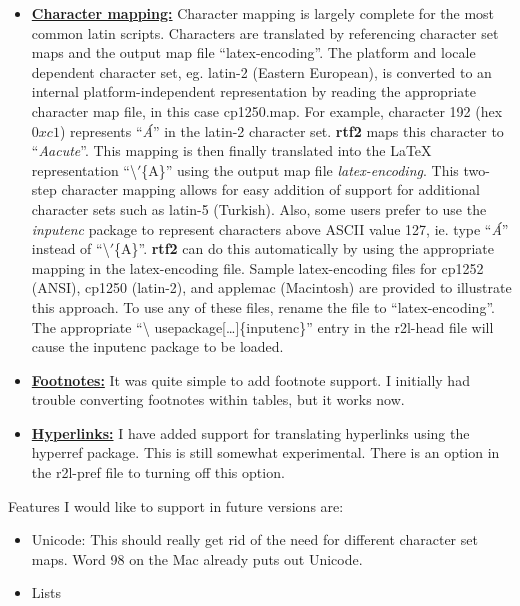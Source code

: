 \documentclass[11pt]{article}
\def\rtf2latex2e{{\bf rtf2\LaTeXe}}
\begin{document}
\begin{itemize}
\item 
{\bf {\underline {Character mapping:}}} Character mapping is largely
complete for the most common latin scripts.  Characters are translated
by referencing character set maps and the output map file
``latex-encoding''.  The platform and locale dependent character set, eg. 
latin-2 (Eastern European), is converted to an internal
platform-independent representation by reading the appropriate
character map file, in this case cp1250.map.  For example, character
192 (hex $0xc1$) represents ``\textit{\'{A}}'' in the latin-2
character set.  \rtf2latex2e maps this character to
``\textit{Aacute}''.  This mapping is then finally translated into the
{\LaTeX} representation ``\textbackslash$'$\{A\}'' using the output
map file \textit{latex-encoding}.  This two-step character mapping allows for
easy addition of support for additional character sets such as latin-5
(Turkish).  Also, some users prefer to use the \textit{inputenc}
package to represent characters above ASCII value 127, ie.  type
``\textit{\'{A}}'' instead of ``\textbackslash$'$\{A\}''. 
\rtf2latex2e can do this automatically by using the appropriate
mapping in the latex-encoding file.  Sample latex-encoding files for cp1252 (ANSI),
cp1250 (latin-2), and applemac (Macintosh) are provided to illustrate
this approach.  To use any of these files, rename the file to
``latex-encoding''.  The appropriate ``\textbackslash
usepackage[\ldots]\{inputenc\}'' entry in the r2l-head file will cause
the inputenc package to be loaded.

\item
{\bf {\underline {Footnotes:}}} It was quite simple to add footnote
support.  I initially had trouble converting footnotes within tables,
but it works now.

\item
{\bf {\underline {Hyperlinks:}}} I have added support for translating
hyperlinks using the hyperref package.  This is still somewhat
experimental.  There is an option in the r2l-pref file to turning off
this option.


\end{itemize}

\noindent
Features I would like to support in future versions are:
\begin{itemize}
\item
Unicode: This should really get rid of the need for different
character set maps.  Word 98 on the Mac already puts out Unicode.
\item
Lists
\end{itemize}
\end{document}
